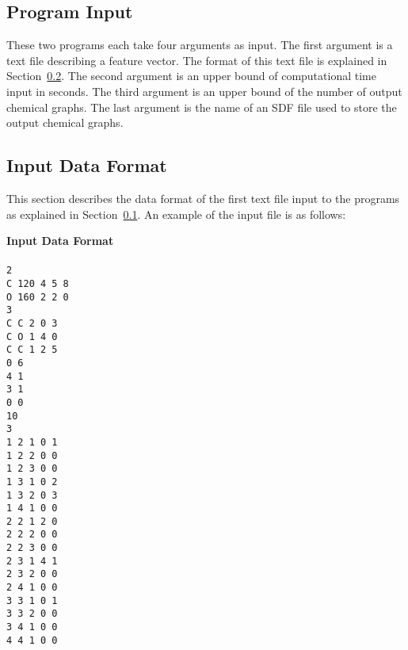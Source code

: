 \documentclass[11pt,titlepage,dvipdfmx,twoside]{article}
\begin{document}
\subsection{Program Input}
\label{sec:Input}

These two programs each take four arguments as input.
The first argument is a text file describing a feature vector.
The format of this text file is explained in Section~\ref{sec:InputFormat}.
The second argument is an upper bound of computational time input in seconds.
The third argument is an upper bound of the number of output chemical graphs.
The last argument is the name of an SDF file used to store the output chemical graphs.

\bigskip

\newpage
\subsection{Input Data Format}
\label{sec:InputFormat}

This section describes the data format of the first text file input 
to the programs as explained in Section~\ref{sec:Input}.
An example of the input file is as follows:

\bigskip

\begin{oframed}
{\bf Input Data Format}\\\\
{\tt 2\\
C 120 4 5 8\\
O 160 2 2 0\\
3\\
C C 2 0 3\\
C O 1 4 0\\
C C 1 2 5\\
0 6\\
4 1\\
3 1\\
0 0\\
10\\
3\\
1 2 1 0 1\\
1 2 2 0 0\\
1 2 3 0 0\\
1 3 1 0 2\\
1 3 2 0 3\\
1 4 1 0 0\\
2 2 1 2 0\\
2 2 2 0 0\\
2 2 3 0 0\\
2 3 1 4 1\\
2 3 2 0 0\\
2 4 1 0 0\\
3 3 1 0 1\\
3 3 2 0 0\\
3 4 1 0 0\\
4 4 1 0 0\\}
\end{oframed}
\end{document}
